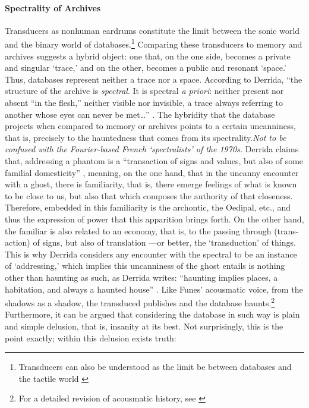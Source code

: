 \paragraph{Spectrality of Archives}
Transducers as nonhuman eardrums constitute the limit between the sonic world and the binary world of databases.\footnote{Transducers can also be understood as the limit be between databases and the tactile world \parencite[223]{Eck13:Bet}} Comparing these transducers to memory and archives suggests a hybrid object: one that, on the one side, becomes a private and singular `trace,' and on the other, becomes a public and resonant `space.' Thus, databases represent neither a trace nor a space. According to Derrida, ``the structure of the archive is \textit{spectral}. It is spectral \textit{a priori}: neither present nor absent ``in the flesh,'' neither visible nor invisible, a trace always referring to another whose eyes can never be met\dots'' \parencite[54]{Der95:Arc}. The hybridity that the database projects when compared to memory or archives points to a certain uncanniness, that is, precisely to the hauntedness that comes from its spectrality.\textit{Not to be confused with the Fourier-based French `spectralists' of the 1970s.} Derrida claims that, addressing a phantom is a ``transaction of signs and values, but also of some familial domesticity'' \parencite[55]{Der95:Arc}, meaning, on the one hand, that in the uncanny encounter with a ghost, there is familiarity, that is, there emerge feelings of what is known to be close to us, but also that which composes the authority of that closeness. Therefore, embedded in this familiarity is the archontic, the Oedipal, etc., and thus the expression of power that this apparition brings forth. On the other hand, the familiar is also related to an economy, that is, to the passing through (trans-action) of signs, but also of translation ---or better, the `transduction' of things. This is why Derrida considers any encounter with the spectral to be an instance of `addressing,' which implies this uncanniness of the ghost entails is nothing other than haunting as such, as Derrida writes: ``haunting implies places, a habitation, and always a haunted house'' \parencite[55]{Der95:Arc}. Like Funes' acousmatic voice, from the shadows as a shadow, the transduced publishes and the database haunts.\footnote{For a detailed revision of acousmatic history, see \textcite{Kan14:Sou}} Furthermore, it can be argued that considering the database in such way is plain and simple delusion, that is, insanity at its best. Not surprisingly, this is the point exactly; within this delusion exists truth:

